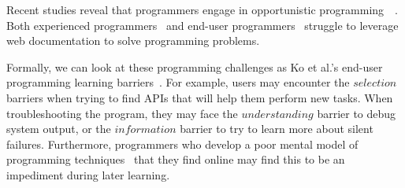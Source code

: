 Recent studies reveal that programmers engage in opportunistic programming~\cite{brandt_two_2009}\cite{brandt_example-centric_2010}\cite{hartmann_hacking_2008}~.
Both experienced programmers~\cite{duala-ekoko_asking_2012} and end-user programmers~\cite{dorn_lost_2013}\cite{dorn_learning_2010}\cite{rosson_everyday_2004} struggle to leverage web documentation to solve programming problems.

Formally, we can look at these programming challenges as Ko et al.'s end-user programming learning barriers~\cite{ko_six_2004}.
For example, users may encounter the $selection$ barriers when trying to find APIs that will help them perform new tasks.
When troubleshooting the program, they may face the $understanding$ barrier to debug system output, or the $information$ barrier to try to learn more about silent failures.
Furthermore, programmers who develop a poor mental model of programming techniques~\cite{winslow_programming_1996} that they find online may find this to be an impediment during later learning.

